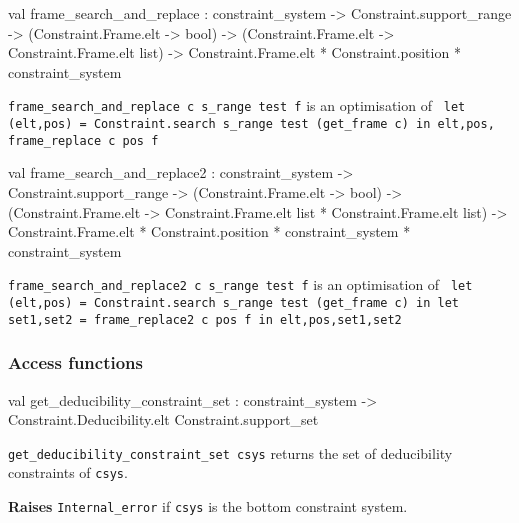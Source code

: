 \label{val:Constraint-underscoresystem.frame-underscoresearch-underscoreand-underscorereplace}\begin{ocamldoccode}
val frame_search_and_replace :
  constraint_system ->
  Constraint.support_range ->
  (Constraint.Frame.elt -> bool) ->
  (Constraint.Frame.elt -> Constraint.Frame.elt list) ->
  Constraint.Frame.elt * Constraint.position *
  constraint_system
\end{ocamldoccode}
\begin{ocamldocdescription}
{\tt{frame\_search\_and\_replace c s\_range test f}} is an optimisation of
{\tt{{} let (elt,pos) = Constraint.search s\_range test (get\_frame c) in\
elt,pos, frame\_replace c pos f{}}}


\end{ocamldocdescription}




\label{val:Constraint-underscoresystem.frame-underscoresearch-underscoreand-underscorereplace2}\begin{ocamldoccode}
val frame_search_and_replace2 :
  constraint_system ->
  Constraint.support_range ->
  (Constraint.Frame.elt -> bool) ->
  (Constraint.Frame.elt ->
   Constraint.Frame.elt list * Constraint.Frame.elt list) ->
  Constraint.Frame.elt * Constraint.position *
  constraint_system * constraint_system
\end{ocamldoccode}
\begin{ocamldocdescription}
{\tt{frame\_search\_and\_replace2 c s\_range test f}} is an optimisation of
{\tt{{\char123} let (elt,pos) = Constraint.search s\_range test (get\_frame c) in\
let set1,set2 = frame\_replace2 c pos f in\
elt,pos,set1,set2{}}}


\end{ocamldocdescription}




\subsubsection{Access functions}




\label{val:Constraint-underscoresystem.get-underscorededucibility-underscoreconstraint-underscoreset}\begin{ocamldoccode}
val get_deducibility_constraint_set :
  constraint_system ->
  Constraint.Deducibility.elt Constraint.support_set
\end{ocamldoccode}
\begin{ocamldocdescription}
{\tt{get\_deducibility\_constraint\_set csys}} returns the set of deducibility constraints of {\tt{csys}}.

{\bf Raises} {\tt{Internal\_error}} if {\tt{csys}} is the bottom constraint system.


\end{ocamldocdescription}




